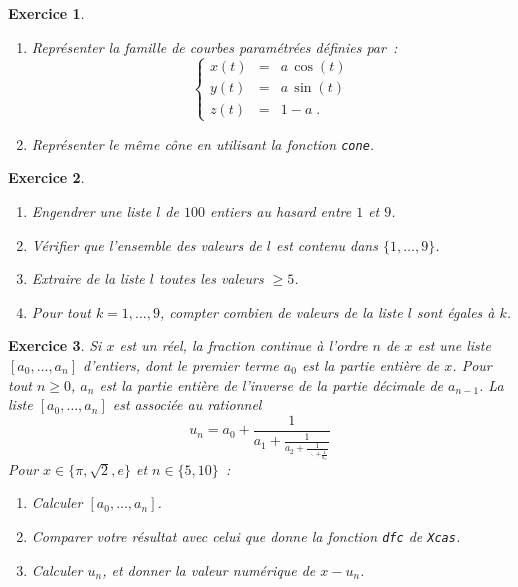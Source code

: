 \documentclass{article}
\newtheorem{exo}{Exercice}[section]
\begin{document}
\begin{giacjshere}
\begin{exo}
{\begin{enumerate}
\item
Repr\'esenter la famille de courbes param\'etr\'ees d\'efinies par~: 
$$
\left\{
\begin{array}{lcl}
x(t)&=& a\,\cos(t)\\
y(t)&=& a\,\sin(t)\\
z(t)&=& 1-a\;.
\end{array}
\right.
$$
\item 
Repr\'esenter le m\^eme c\^one en utilisant la fonction \verb|cone|.
\end{enumerate} 
}\end{exo}
\begin{exo}{\rm ~
\begin{enumerate}
\item
Engendrer une liste $l$ de $100$ entiers au hasard entre $1$ et $9$.
\item
V\'erifier que l'ensemble des valeurs de $l$ est contenu dans
$\{1,\ldots,9\}$.
\item
Extraire de la liste $l$ toutes les valeurs $\geq 5$.
\item
Pour tout $k=1,\ldots,9$, compter combien de valeurs de la liste $l$ 
sont \'egales \`a $k$. 
\end{enumerate} 
}\end{exo}
\begin{exo}{\rm
Si $x$ est un r\'eel, la fraction continue \`a l'ordre $n$ de $x$ est
une liste $[a_0,\ldots,a_n]$ d'entiers, dont le premier terme $a_0$
est la partie enti\`ere de $x$. Pour tout $n\geq 0$, $a_n$ est la
partie enti\`ere de l'inverse de la partie d\'ecimale de $a_{n-1}$.
La liste $[a_0,\ldots,a_n]$ est associ\'ee au rationnel
$$
u_n = a_0+\frac{1}{\displaystyle{a_1+
\frac{1}{\displaystyle{a_2+\frac{1}{\ddots+\displaystyle{\frac{1}{a_n}}}}}}}
$$
Pour $x\in\{\pi,\sqrt{2}, e\}$ et $n\in \{5,10\}$~:
\begin{enumerate}
\item
Calculer $[a_0,\ldots,a_n]$.
\item
Comparer votre r\'esultat avec celui que donne la fonction \verb|dfc|
de {\tt Xcas}. 
\item
Calculer $u_n$, et donner la valeur num\'erique de $x-u_n$.
\end{enumerate}
}\end{exo}


\end{giacjshere}
\end{document}
